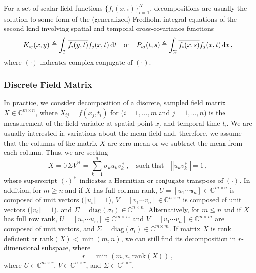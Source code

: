\documentclass[10pt]{article}
\newcommand{\norm}[1]{\left\Vert#1\right\Vert}
\begin{document}
For a set of scalar field functions $\{f_i(x,t)\}_{i=1}^N$, decompositions are usually the solution to some form of the (generalized) Fredholm integral equations of the second kind involving spatial and temporal cross-covariance functions
\begin{equation}
    K_{ij}(x,y)  \triangleq 
    \int_T \overline{f_i(y,t)} f_j(x,t)\, \mathrm{d}t \quad \mathrm{or}\quad 
    P_{ij}(t,s) \triangleq \int_{\cal X} \overline{f_i(x,s)} f_j(x,t)\, \mathrm{d}x\,,
\end{equation}
where $\overline{(\cdot)}$ indicates complex conjugate of ${(\cdot)}$.


\subsubsection{Discrete Field Matrix}
In practice, we consider decomposition of a discrete, sampled field matrix $X\in \mathbb{C}^{m\times n}$, where $X_{ij}= f(x_j,t_i)$ for ($i = 1,\ldots,m$ and $j = 1,\ldots,n$) is the measurement of the field variable at spatial point $x_j$ and temporal time $t_i$. 
We are usually interested in variations about the mean-field and, therefore, we assume that the columns of the matrix $X$ are zero mean or we subtract the mean from each column. 
Thus, we are seeking\begin{equation}
    X = U\Sigma V^\mathrm{H} = \sum_{k=1}^n \sigma_k u_k v_k^\mathrm{H}\,, \quad \mathrm{such\; that}\quad \norm{u_k v_k^\mathrm{H}} = 1\,,
\end{equation}
where superscript $(\cdot)^\mathrm{H}$ indicates a Hermitian or conjugate transpose of $(\cdot)$.
In addition,  for $m\ge n$ and if $X$ has full column rank, $U = [u_1 \cdots u_n] \in \mathbb{C}^{m\times n}$ is composed of unit vectors ($\norm{u_i}=1$), $V = [v_1 \cdots v_n] \in \mathbb{C}^{n\times n}$ is composed of unit vectors ($\norm{v_i}=1$), and $\Sigma = \mathrm{diag}(\sigma_{i})\in\mathbb{C}^{n\times n}$. 
Alternatively, for $m\le n$ and if $X$ has full row rank, $U = [u_1 \cdots u_m] \in \mathbb{C}^{m\times m}$ and $V = [v_1 \cdots v_n] \in \mathbb{C}^{n\times m}$ are composed of unit vectors, and $\Sigma = \mathrm{diag}(\sigma_{i})\in\mathbb{C}^{m\times m}$.
If matrix $X$ is rank deficient or $\mathrm{rank}(X) < \min(m, n)$, we can still find its decomposition in $r$-dimensional subspace, where
\begin{equation}
    r = \min\left(m,n,\mathrm{rank}(X)\right)\,,
\end{equation}
where $U \in \mathbb{C}^{m\times r}$, $V \in \mathbb{C}^{n\times r}$, and $\Sigma \in\mathbb{C}^{r\times r}$.
\end{document}
